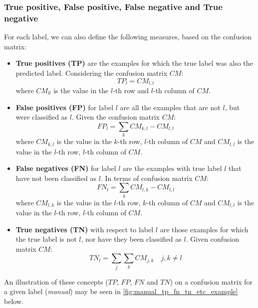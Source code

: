 \subsubsection{True positive, False positive, False negative and True negative}
\label{sec:true_positives}
For each label, we can also define the following measures, based on the confusion matrix:
\begin{itemize}
    \item \textbf{True positives (TP)} are the examples for which the true label was also the predicted label. Considering the confusion matrix $CM$:
        \begin{equation*}
            TP_l = CM_{l,l}
        \end{equation*}
    where $CM_{ll}$ is the value in the $l$-th row and $l$-th column of $CM$.
    
    \item \textbf{False positives (FP)} for label $l$ are all the examples that are not $l$, but were classified as $l$. Given the confusion matrix $CM$:
        \begin{equation*}
            FP_l = \sum_k CM_{k,l} - CM_{l,l}
        \end{equation*}
    where $CM_{k,l}$ is the value in the $k$-th row, $l$-th column of $CM$ and $CM_{l,l}$ is the value in the $l$-th row, $l$-th column of $CM$.
    
    \item \textbf{False negatives (FN)} for label $l$ are the examples with true label $l$ that have not been classified as $l$. In terms of confusion matrix $CM$:
    \begin{equation*}
        FN_l = \sum_k CM_{l,k} - CM_{l,l}
    \end{equation*}
    where $CM_{l,k}$ is the value in the $l$-th row, $k$-th column of $CM$ and $CM_{l,l}$ is the value in the $l$-th row, $l$-th column of $CM$.
    
    \item \textbf{True negatives (TN)} with respect to label $l$ are those examples for which the true label is not $l$, nor have they been classified as $l$. Given confusion matrix $CM$:
    \begin{equation*}
        TN_l = \sum_j\sum_k CM_{j,k} \quad j,k \neq l
    \end{equation*}
\end{itemize}

An illustration of these concepts ($TP$, $FP$, $FN$ and $TN$) on a confusion matrix for a given label (\textit{manual}) may be seen in \cref{fig:manual_tp_fn_tn_etc_example} below. 


